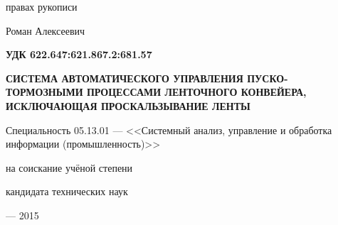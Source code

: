 \fontsize{14pt}{15pt}\selectfont  %
\thispagestyle{empty}

\vspace{10mm}
\begin{flushright}
   правах рукописи
\end{flushright}

\vspace{30mm}
\begin{center}
{\Large{} Роман Алексеевич}
\end{center}

\vspace{10mm}
\begin{flushright}
{\bf УДК 622.647:621.867.2:681.57}
\end{flushright}

\vspace{10mm}
\begin{center}
{\bf \LARGE СИСТЕМА АВТОМАТИЧЕСКОГО УПРАВЛЕНИЯ ПУСКО-ТОРМОЗНЫМИ ПРОЦЕССАМИ ЛЕНТОЧНОГО КОНВЕЙЕРА, ИСКЛЮЧАЮЩАЯ ПРОСКАЛЬЗЫВАНИЕ ЛЕНТЫ
\par}

\vspace{10mm}
{\Large
Специальность 05.13.01 --- <<Системный анализ, управление и обработка информации (промышленность)>>
}

\vspace{15mm}
\par
{} на соискание учёной степени\par
кандидата технических наук
\end{center}

\vspace{30mm}
\begin{center}
{ --- 2015}
\end{center}

\newpage

